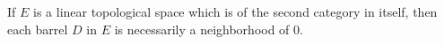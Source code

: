 If $E$ is a linear topological space which is of the second category in itself, then each barrel $D$ in $E$ is necessarily a neighborhood of $0$.
